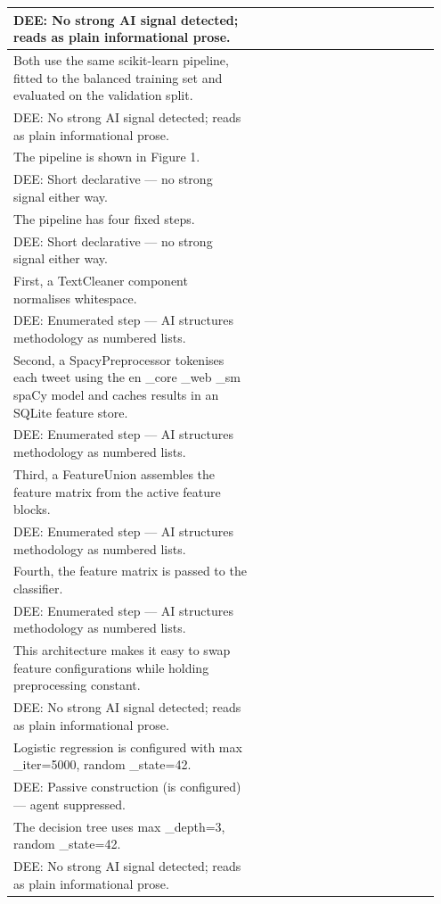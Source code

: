 \documentclass[11pt]{article}
\begin{document}
\begin{longtable}{|p{0.55\linewidth}|p{0.40\linewidth}|}
\hline
DEE: No strong AI signal detected; reads as plain informational prose. & \\
\hline
Both use the same scikit-learn pipeline, fitted to the balanced training set and evaluated on the validation split. & \\[2pt]
\hline
DEE: No strong AI signal detected; reads as plain informational prose. & \\
\hline
The pipeline is shown in Figure 1. & \\[2pt]
\hline
DEE: Short declarative --- no strong signal either way. & \\
\hline
The pipeline has four fixed steps. & \\[2pt]
\hline
DEE: Short declarative --- no strong signal either way. & \\
\hline
First, a TextCleaner component normalises whitespace. & \\[2pt]
\hline
DEE: Enumerated step --- AI structures methodology as numbered lists. & \\
\hline
Second, a SpacyPreprocessor tokenises each tweet using the en \_core \_web \_sm spaCy model and caches results in an SQLite feature store. & \\[2pt]
\hline
DEE: Enumerated step --- AI structures methodology as numbered lists. & \\
\hline
Third, a FeatureUnion assembles the feature matrix from the active feature blocks. & \\[2pt]
\hline
DEE: Enumerated step --- AI structures methodology as numbered lists. & \\
\hline
Fourth, the feature matrix is passed to the classifier. & \\[2pt]
\hline
DEE: Enumerated step --- AI structures methodology as numbered lists. & \\
\hline
This architecture makes it easy to swap feature configurations while holding preprocessing constant. & \\[2pt]
\hline
DEE: No strong AI signal detected; reads as plain informational prose. & \\
\hline
Logistic regression is configured with max \_iter=5000, random \_state=42. & \\[2pt]
\hline
DEE: Passive construction (is configured) --- agent suppressed. & \\
\hline
The decision tree uses max \_depth=3, random \_state=42. & \\[2pt]
\hline
DEE: No strong AI signal detected; reads as plain informational prose. & \\

\end{longtable}
\end{document}
